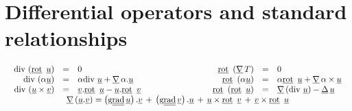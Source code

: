\section{Differential operators and standard relationships}
\begin{equation*}
\begin{array}{c}
%
\begin{array}{r c l @{\hspace{3cm}} r c l }
\dive \left(  \rot \, \vect{u}\right) &=&0  &
\rot  \left(  \gradv \, T\right)  &=&0 \\
\dive \left( \alpha  \vect{u} \right) &=& \alpha \dive \, \vect{u} + \gradv \, \alpha . \vect{u}  &
\rot \left( \alpha  \vect{u} \right) &=& \alpha \rot \, \vect{u} + \gradv \, \alpha  \times  \vect{u} \\
\dive \left(   \vect{u} \times \vect{v} \right) &=& \vect{v}. \rot \, \vect{u} - \vect{u} . \rot \, \vect{v} &
\rot \left( \rot \, \vect{u} \right) & = & \grad \left( \dive \, \vect{u} \right)  - \vect{\Delta } \, \vect{u}
\end{array}
\\
\grad \left( \vect{u}. \vect{v} \right) = \left( \ggrad  \vect{u} \right) . \vect{v}  \, + \,  \left( \ggrad  \vect{v} \right) . \vect{u} \, + \, \vect{u} \times \rot \, \vect{v}
\, + \,  \vect{v} \times \rot \, \vect{u} \\
\end{array}
\end{equation*}
%
%
%
\newpage
